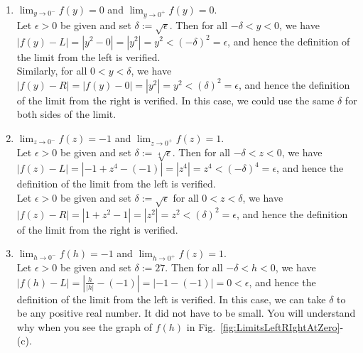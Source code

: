 \begin{enumerate}
\renewcommand{\labelenumi}{(\alph{enumi})}
\setlength{\itemsep}{.2cm}

  \item  \Ans $\displaystyle \lim_{y \to 0^-} f(y) = 0$ and $\displaystyle \lim_{y \to 0^+} f(y) = 0$. \\

  Let $\epsilon>0$ be given and set $\delta := \sqrt{\epsilon}$. Then for all $-\delta < y < 0$, we have $|f(y)-L| = |y^2-0| = |y^2| = y^2 < (-\delta)^2 = \epsilon$, and hence the definition of the limit from the left is verified. \\

  Similarly, for all $0 < y < \delta$, we have $|f(y)-R| = |f(y)-0| = |y^2| = y^2 < (\delta)^2 = \epsilon$, and hence the definition of the limit from the right is verified. In this case, we could use the same $\delta$ for both sides of the limit.
 
  

  \item  \Ans $\displaystyle \lim_{z \to 0^-} f(z) = -1$ and $\displaystyle \lim_{z \to 0^+} f(z) = 1$. \\

  Let $\epsilon>0$ be given and set $\delta:= \sqrt[4]{\epsilon}$. Then for all $-\delta < z < 0$, we have $|f(z)-L| = |-1+z^4-(-1)| = |z^4| = z^4 < (-\delta)^4 = \epsilon$, and hence the definition of the limit from the left is verified. \\

  Let $\epsilon>0$ be given and set $\delta:= \sqrt{\epsilon}$ for all $0 < z < \delta$, we have $|f(z)-R| = |1+ z^2-1| = |z^2| = z^2 < (\delta)^2 = \epsilon$, and hence the definition of the limit from the right is verified.
  

    
    \item  \Ans $\displaystyle \lim_{h \to 0^-} f(h) = -1$ and $\displaystyle \lim_{h \to 0^+} f(z) = 1$. \\

  Let $\epsilon>0$ be given and set $\delta:= 27$. Then for all $-\delta < h < 0$, we have $|f(h)-L| = |\frac{h}{|h|}-(-1)| = |-1 - (-1)| = 0 < \epsilon$, and hence the definition of the limit from the left is verified. In this case, we can take $\delta$ to be any positive real number. It did not have to be small. You will understand why when you see the graph of $f(h)$ in Fig.~\ref{fig:LimitsLeftRIghtAtZero}-(c).\\


\end{enumerate}
